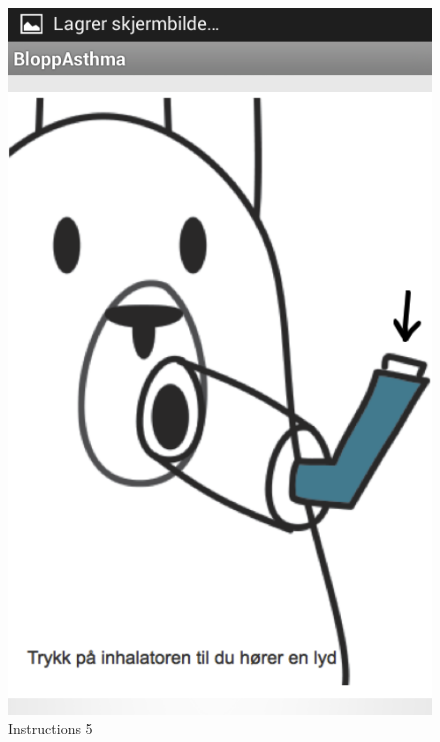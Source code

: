 \begin{figure}[H]
\begin{minipage}[b]{0.3\linewidth}
		\includegraphics[width=0.20\paperwidth]{Pictures/app-screenshots/instructions-5.png}
		\caption{Instructions 5}
		\label{fig:instructions-5}
	\end{minipage}
	\begin{minipage}[b]{0.3\linewidth}
		\centering

\end{minipage}
\end{figure}
